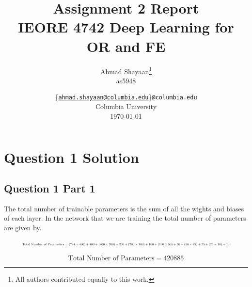 \documentclass[12pt]{report}
\title{\Large{\textbf{Assignment 2 Report}}\\\Large{IEORE 4742 Deep Learning for OR and FE}}
\author{
    Ahmad Shayaan\thanks{All authors contributed equally to this work.} \\as5948
    }
\date{
\{\href{mailto:ahmad.shayaan@columbia.edu}{\texttt{\small{ahmad.shayaan@columbia.edu}}}\}\texttt{\small{@columbia.edu}}\\
    Columbia University\\
    \today}
\begin{document}
\maketitle

\pagebreak

\chapter*{Question 1 Solution }

\section*{Question 1 Part 1}

The total number of trainable parameters is the sum of all the wights and biases of each layer. In the network that we are training the total number of parameters are given by.

\begin{equation*}
	\resizebox{.9\hsize}{!}{
		\text{Total Number of Parameters} = $(784 \times 400) + 400 + (400 \times 200) + 200 + (200 \times 100) + 100 + (100 \times 50) + 50 + (50 \times 25) + 25 + (25 \times 10) + 10$  
	}
\end{equation*}

\begin{equation*}
\text{Total Number of Parameters} = 420885
\end{equation*}
	
\end{document}
